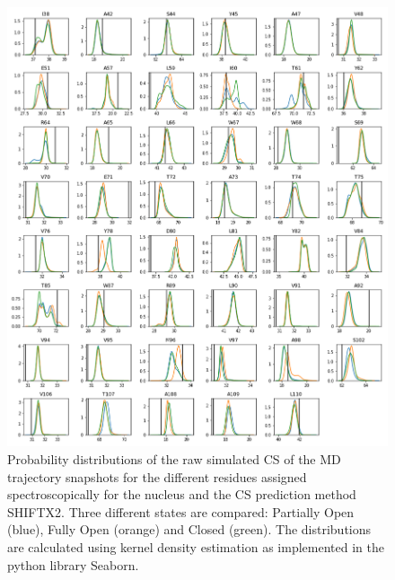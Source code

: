 \documentclass[%
 aip,
 amsmath,amssymb,
 preprint,%
]{revtex4-1}
\newcommand{\ca}{\ce{C_\alpha} }
\begin{document}
\begin{figure}[tbp]
	\includegraphics[width=\textwidth]{figures_SI/hist_shiftx2_CB.png}
	 \caption{\scriptsize
 Probability distributions of the raw simulated CS of the MD trajectory snapshots for the different residues assigned spectroscopically for the \ca nucleus and the CS prediction method SHIFTX2. Three different states are compared: Partially Open (blue), Fully Open (orange) and Closed (green). The distributions are calculated using kernel density estimation as implemented in the python library Seaborn. 
}
\label{SI_hist2}
\end{figure}
\end{document}
